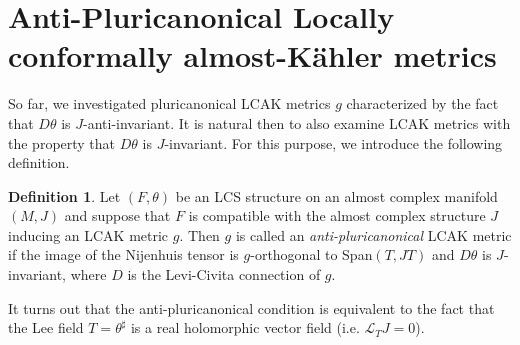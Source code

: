 \documentclass[a4paper,11pt]{amsart}
\newtheorem{cor}[thm]{Corollary}
\theoremstyle{definition}
\newtheorem{defn}[thm]{Definition}
\renewcommand{\[}{\begin{equation*}}
\renewcommand{\]}{\end{equation*}}
\begin{document}




 
 
 \section{Anti-Pluricanonical Locally conformally almost-K\"ahler metrics}\label{sec-anti-plu}

 So far, we investigated pluricanonical LCAK metrics $g$ characterized by the fact that $D\theta$ is $J$-anti-invariant. It is natural then to also examine LCAK metrics with the property that $D\theta$ is $J$-invariant. For this purpose, we introduce the following definition.
  
  \begin{defn}\label{def-anti-pluricanonical}
  Let $(F,\theta)$ be an LCS structure on an almost complex manifold $(M,J)$ and suppose that $F$ is compatible with the almost complex structure $J$ inducing an LCAK metric $g$. Then $g$ is called an {\it anti-pluricanonical} LCAK metric if the image of the Nijenhuis tensor is $g$-orthogonal to Span$(T,JT)$ and $D\theta$ is $J$-invariant, where $D$ is the Levi-Civita connection of $g$.
  \end{defn}
  
  
 It turns out that the anti-pluricanonical condition is equivalent to the fact that the Lee field $T=\theta^\sharp$ is a real holomorphic vector field (i.e. $\mathcal{L}_TJ=0$).
 
\end{document}
